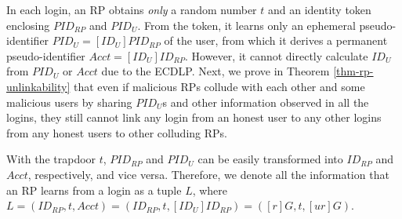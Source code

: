 In each login, an RP obtains \emph{only} a random number $t$ and an identity token enclosing $PID_{RP}$ and $PID_U$. From the token, it learns only an ephemeral pseudo-identifier $PID_{U} = [{ID_U}]{PID_{RP}}$ of the user, from which it derives a permanent pseudo-identifier $Acct = [ID_U]ID_{RP}$. However, it cannot directly calculate $ID_U$ from $PID_{U}$ or $Acct$ due to the ECDLP.
Next, we prove in Theorem \ref{thm-rp-unlinkability} that even if malicious RPs collude with each other and some malicious users by sharing $PID_U$s and other information observed in all the logins, they still cannot link any login from an honest user to any other logins from any honest users to other colluding RPs.




With the trapdoor $t$, $PID_{RP}$ and $PID_U$ can be easily transformed into $ID_{RP}$ and $Acct$, respectively, and vice versa. Therefore, we denote all the information that an RP learns from a login as a tuple $L$, where $L =(ID_{RP}, t, Acct)=(ID_{RP}, t, [ID_{U}]ID_{RP})=([r]G, t, [ur]G)$.



